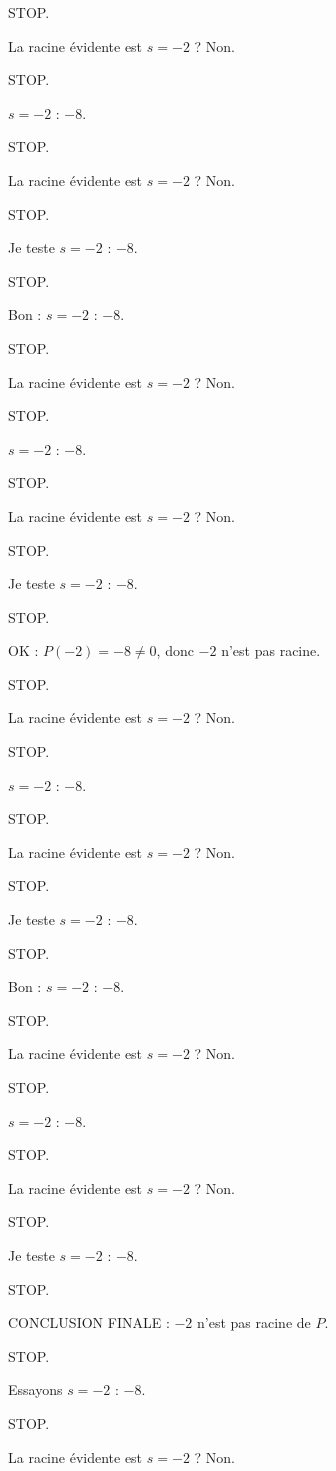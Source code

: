 \documentclass[11pt]{article}
\begin{document}
\begin{exoresolu}
\begin{enumerate}
STOP. 

La racine évidente est $s = -2$ ? Non. 

STOP. 

$s = -2$ : $-8$. 

STOP. 

La racine évidente est $s = -2$ ? Non. 

STOP. 

Je teste $s = -2$ : $-8$. 

STOP. 

Bon : $s = -2$ : $-8$. 

STOP. 

La racine évidente est $s = -2$ ? Non. 

STOP. 

$s = -2$ : $-8$. 

STOP. 

La racine évidente est $s = -2$ ? Non. 

STOP. 

Je teste $s = -2$ : $-8$. 

STOP. 

OK : $P(-2) = -8 \neq 0$, donc $-2$ n'est pas racine. 

STOP. 

La racine évidente est $s = -2$ ? Non. 

STOP. 

$s = -2$ : $-8$. 

STOP. 

La racine évidente est $s = -2$ ? Non. 

STOP. 

Je teste $s = -2$ : $-8$. 

STOP. 

Bon : $s = -2$ : $-8$. 

STOP. 

La racine évidente est $s = -2$ ? Non. 

STOP. 

$s = -2$ : $-8$. 

STOP. 

La racine évidente est $s = -2$ ? Non. 

STOP. 

Je teste $s = -2$ : $-8$. 

STOP. 

CONCLUSION FINALE : $-2$ n'est pas racine de $P$. 

STOP. 

Essayons $s = -2$ : $-8$. 

STOP. 

La racine évidente est $s = -2$ ? Non. 


\end{enumerate}
\end{exoresolu}
\end{document}
